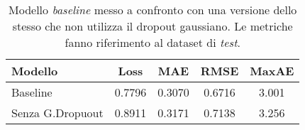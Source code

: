 \begin{table}[tbp]
  \centering
  \begin{tabular}{lcccc}
    \toprule
    Modello & Loss & MAE & RMSE & MaxAE \\
    \midrule
    Baseline      & 0.7796 & 0.3070 & 0.6716 & 3.001 \\
    Senza G.Dropuout & 0.8911 & 0.3171 & 0.7138 & 3.256 \\
    \bottomrule
  \end{tabular}
  \caption{Modello \emph{baseline} messo a confronto con una versione dello
    stesso che non utilizza il dropout gaussiano. Le metriche fanno riferimento
      al dataset di \emph{test}.}%
  \label{tab:nogaussdrop}%
\end{table}
